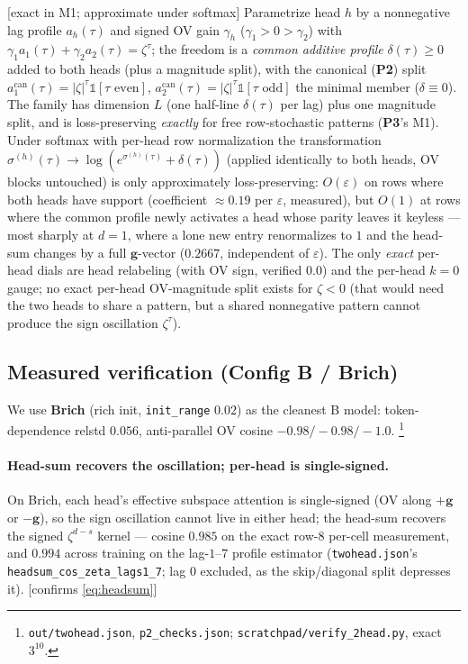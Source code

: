 \documentclass{article}
\newcommand{\gb}{\boldsymbol{g}}
\newcommand{\ind}{\mathbb{1}}
\newcommand{\htag}[1]{{\normalfont\sffamily\footnotesize[#1]}}
\newcommand{\Ptwo}{\textbf{P2}}
\newcommand{\Pthree}{\textbf{P3}}
\begin{document}
\begin{prop}\label{prop:hinge}
\htag{exact in M1; approximate under softmax} Parametrize head $h$ by a nonnegative
lag profile $a_h(\tau)$ and signed OV gain $\gamma_h$ ($\gamma_1>0>\gamma_2$) with
$\gamma_1a_1(\tau)+\gamma_2a_2(\tau)=\zeta^\tau$; the freedom is a \emph{common
additive profile} $\delta(\tau)\ge0$ added to both heads (plus a magnitude split),
with the canonical (\Ptwo) split $a_1^{\mathrm{can}}(\tau)=|\zeta|^\tau\ind[\tau\text{ even}]$,
$a_2^{\mathrm{can}}(\tau)=|\zeta|^\tau\ind[\tau\text{ odd}]$ the minimal member
($\delta\equiv0$). The family has dimension $L$ (one half-line $\delta(\tau)$ per lag)
plus one magnitude split, and is loss-preserving \emph{exactly} for free
row-stochastic patterns (\Pthree's M1). Under softmax with per-head row normalization
the transformation
$\sigma^{(h)}(\tau)\to\log(e^{\sigma^{(h)}(\tau)}+\delta(\tau))$ (applied identically
to both heads, OV blocks untouched) is only approximately loss-preserving:
$O(\varepsilon)$ on rows where both heads have support (coefficient
$\approx0.19$ per $\varepsilon$, measured), but \emph{$O(1)$} at rows where the common
profile newly activates a head whose parity leaves it keyless --- most sharply at
$d=1$, where a lone new entry renormalizes to $1$ and the head-sum changes by a full
$\gb$-vector ($0.2667$, independent of $\varepsilon$). The only \emph{exact} per-head
dials are head relabeling (with OV sign, verified $0.0$) and the per-head $k{=}0$
gauge; no exact per-head OV-magnitude split exists for $\zeta<0$ (that would need the
two heads to share a pattern, but a shared nonnegative pattern cannot produce the sign
oscillation $\zeta^\tau$).
\end{prop}

\subsection{Measured verification (Config B / Brich)}\label{sec:hingemeas}

We use \textbf{Brich} (rich init, \texttt{init\_range} $0.02$) as the cleanest B
model: token-dependence relstd $0.056$, anti-parallel OV cosine $-0.98/-0.98/-1.0$.%
\footnote{\texttt{out/twohead.json}, \texttt{p2\_checks.json};
\texttt{scratchpad/verify\_2head.py}, exact $3^{10}$.}

\paragraph{Head-sum recovers the oscillation; per-head is single-signed.} On Brich,
each head's effective subspace attention is single-signed (OV along $+\gb$ or $-\gb$),
so the sign oscillation cannot live in either head; the head-sum recovers the signed
$\zeta^{d-s}$ kernel --- cosine $0.985$ on the exact row-$8$ per-cell measurement, and
$0.994$ across training on the lag-$1$--$7$ profile estimator (\texttt{twohead.json}'s
\texttt{headsum\_cos\_zeta\_lags1\_7}; lag 0 excluded, as the skip/diagonal split
depresses it).
\htag{confirms \eqref{eq:headsum}}
\end{document}
